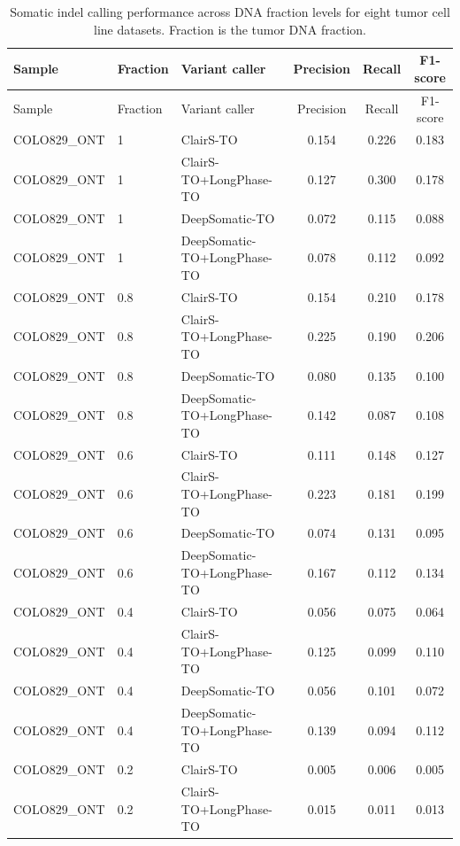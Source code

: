 \documentclass[pdflatex,sn-nature]{sn-jnl}
\begin{document}
\FloatBarrier
{\small
\begin{longtable}{@{}lllccc@{}}
  \caption[Somatic indel calling performance across DNA fraction levels]%
  {Somatic indel calling performance across DNA fraction levels for eight tumor cell line
  datasets. Fraction is the tumor DNA fraction.}
  \label{tab:somatic_indel_purity}\\
  \toprule
  Sample & Fraction & Variant caller & Precision & Recall & F1-score \\
  \midrule
  \endfirsthead
  \toprule
  Sample & Fraction & Variant caller & Precision & Recall & F1-score \\
  \midrule
  \endhead
  \bottomrule
  \endlastfoot
  COLO829\_ONT & 1 & ClairS-TO & 0.154 & 0.226 & 0.183 \\
  COLO829\_ONT & 1 & ClairS-TO+LongPhase-TO & 0.127 & 0.300 & 0.178 \\
  COLO829\_ONT & 1 & DeepSomatic-TO & 0.072 & 0.115 & 0.088 \\
  COLO829\_ONT & 1 & DeepSomatic-TO+LongPhase-TO & 0.078 & 0.112 & 0.092 \\
  COLO829\_ONT & 0.8 & ClairS-TO & 0.154 & 0.210 & 0.178 \\
  COLO829\_ONT & 0.8 & ClairS-TO+LongPhase-TO & 0.225 & 0.190 & 0.206 \\
  COLO829\_ONT & 0.8 & DeepSomatic-TO & 0.080 & 0.135 & 0.100 \\
  COLO829\_ONT & 0.8 & DeepSomatic-TO+LongPhase-TO & 0.142 & 0.087 & 0.108 \\
  COLO829\_ONT & 0.6 & ClairS-TO & 0.111 & 0.148 & 0.127 \\
  COLO829\_ONT & 0.6 & ClairS-TO+LongPhase-TO & 0.223 & 0.181 & 0.199 \\
  COLO829\_ONT & 0.6 & DeepSomatic-TO & 0.074 & 0.131 & 0.095 \\
  COLO829\_ONT & 0.6 & DeepSomatic-TO+LongPhase-TO & 0.167 & 0.112 & 0.134 \\
  COLO829\_ONT & 0.4 & ClairS-TO & 0.056 & 0.075 & 0.064 \\
  COLO829\_ONT & 0.4 & ClairS-TO+LongPhase-TO & 0.125 & 0.099 & 0.110 \\
  COLO829\_ONT & 0.4 & DeepSomatic-TO & 0.056 & 0.101 & 0.072 \\
  COLO829\_ONT & 0.4 & DeepSomatic-TO+LongPhase-TO & 0.139 & 0.094 & 0.112 \\
  COLO829\_ONT & 0.2 & ClairS-TO & 0.005 & 0.006 & 0.005 \\
  COLO829\_ONT & 0.2 & ClairS-TO+LongPhase-TO & 0.015 & 0.011 & 0.013 \\

\end{longtable}}
\end{document}
